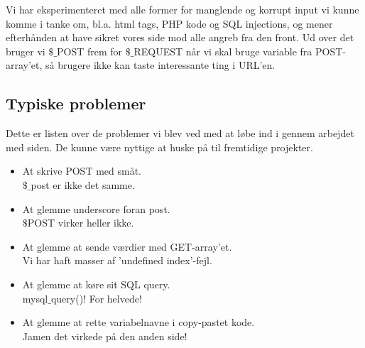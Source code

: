 \documentclass{article}
\begin{document}
Vi har eksperimenteret med alle former for manglende og korrupt input vi kunne komme i tanke om, bl.a. html tags, PHP kode og SQL injections, og mener efterhånden at have sikret vores side mod alle angreb fra den front. Ud over det bruger vi $\$$$\_$POST frem for $\$$$\_$REQUEST når vi skal bruge variable fra POST-array'et, så brugere ikke kan taste interessante ting i URL'en.

\subsection{Typiske problemer}
Dette er listen over de problemer vi blev ved med at løbe ind i gennem arbejdet med siden. De kunne være nyttige at huske på til fremtidige projekter.

\begin{itemize}
	\item At skrive POST med småt. \\
		$\$$$\_$post er ikke det samme.
	\item At glemme underscore foran post. \\
		$\$$POST virker heller ikke.
	\item At glemme at sende værdier med GET-array'et. \\
		Vi har haft masser af 'undefined index'-fejl.
	\item At glemme at køre sit SQL query. \\
		mysql$\_$query()! For helvede!
	\item At glemme at rette variabelnavne i copy-pastet kode. \\
		Jamen det virkede på den anden side!
\end{itemize}
\end{document}
